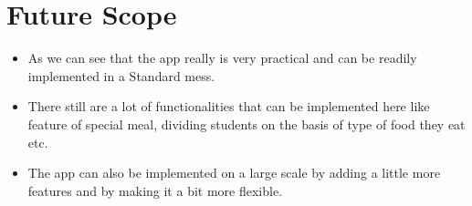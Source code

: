 \newpage
\section{Future Scope}
\begin{itemize}
    \item  As we can see that the app really is very practical and can be readily implemented in a Standard mess.
    \item There still are a lot of functionalities that can be implemented here like feature of special meal, dividing students on the basis of type of food they eat etc.
    \item The app can also be implemented on a large scale by adding a little more features and by making it a bit more flexible.
    
\end{itemize}
